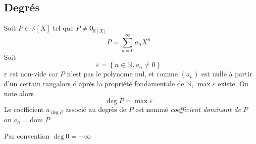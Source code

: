 \documentclass[11pt,colorlinks]{book}
\theoremstyle{mytheoremstyle}
\theoremstyle{mytheoremstyle}
\theoremstyle{mytheoremstyle}
\theoremstyle{mytheoremstyle}
\theoremstyle{mytheoremstyle}
\theoremstyle{mytheoremstyle}
\theoremstyle{mytheoremstyle}
\theoremstyle{mytheoremstyle}
\theoremstyle{myproblemstyle}
\def\mbb#1{\mathbb{#1}}
\def\bN{\mbb{N}}
\def\bK{\mbb{K}}
\def\apcr{à partir d'un certain rang}
\begin{document}
\subsection{Degrés}
\begin{definition}
  Soit $P \in \bK[X]$ tel que $P \not= 0_{\bK[X]}$ 
  \begin{equation*}
    P = \sum_{n=0}^{\infty} a_n X^n
  \end{equation*}
  Soit 
  \begin{equation*}
    \varepsilon = \left\{n \in \bN, a_n \not= 0\right\}
  \end{equation*}
  $\varepsilon$ est non-vide car $P$ n'est pas le polynome nul, et comme $(a_n)$ est nulle \apcr alors d'après la propriété fondamentale de $\bN$, 
  $\max \varepsilon$ existe. On note alors 
  \begin{equation*}
    \deg P = \max \varepsilon
  \end{equation*}
  Le coefficient $a_{\deg P}$ associé au degrès de $P$ est nommé \textit{coefficient dominant de $P$} ou $a_n = \text{dom }P$
\end{definition}
\begin{definition}
  Par convention $\deg 0 = -\infty$
\end{definition}
\end{document}
